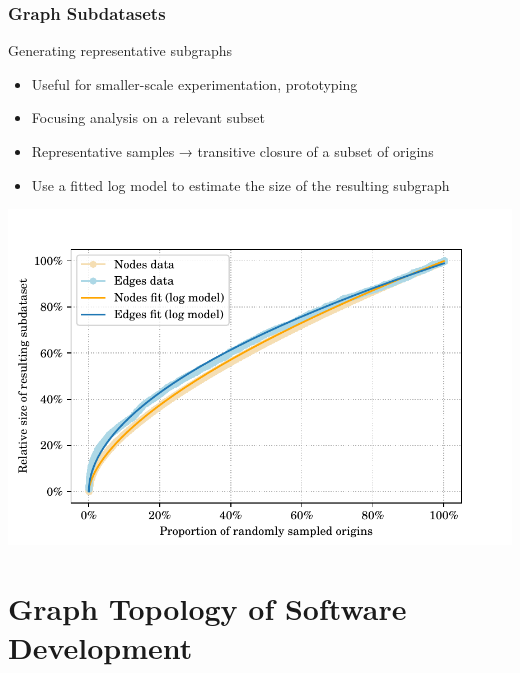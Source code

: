 \documentclass[aspectratio=169,xcolor=table]{beamer}
\begin{document}
    \begin{frame}
        \frametitle{Graph Subdatasets}

        \begin{block}{Generating representative subgraphs}
            \begin{itemize}
                \item Useful for smaller-scale experimentation, prototyping
                \item Focusing analysis on a relevant subset
                \item Representative samples → transitive closure of a subset
                    of origins
                \item Use a fitted log model to estimate the size of the
                    resulting subgraph
            \end{itemize}
        \end{block}

        \begin{center}
            \includegraphics[width=.5\linewidth]{../img/graph-exploitation/subdataset_size_function_fit.pdf}
        \end{center}
    \end{frame}

    \section{Graph Topology of Software Development}
\end{document}
